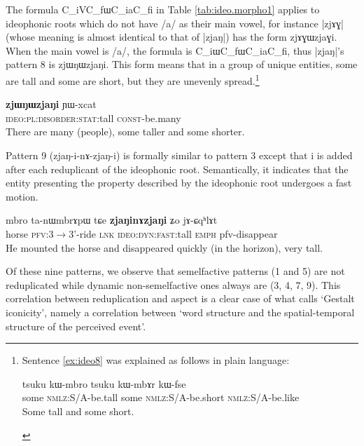 \documentclass[oldfontcommands,oneside,a4paper,11pt]{article}
\newcommand{\ipa}[1]{{\phon \mbox{#1}}} %
\begin{document}
	The formula C_iVC_f\ipa{ɯ}C_i\ipa{a}C_f\ipa{i}  in Table \ref{tab:ideo.morpho1} applies to ideophonic roots  which do  not have /a/ as their main vowel, for instance |\ipa{zjɤɣ}| (whose meaning is almost identical to that of |\ipa{zjaŋ}|) has the form \ipa{zjɤɣɯzjaɣi}. When the main vowel is /a/, the formula is C_i\ipa{ɯ}C_f\ipa{ɯ}C_i\ipa{a}C_f\ipa{i}, thus |\ipa{zjaŋ}|'s pattern 8 is \ipa{zjɯŋɯzjaŋi}. This form means that in a group of unique entities, some are tall and some are short, but  they are unevenly spread.\footnote{Sentence \ref{ex:ideo8} was explained as follows in plain language:
 
 \begin{exe} 
\ex  \label{ex:zjWNWzjaNi:expl}
\gll 
 \ipa{tsuku}  	\ipa{kɯ-mbro}  	\ipa{tsuku}  	\ipa{kɯ-mbɤr}  	\ipa{kɯ-fse}  \\
 some \textsc{nmlz}:S/A-be.tall some \textsc{nmlz}:S/A-be.short \textsc{nmlz}:S/A-be.like \\
 \glt Some tall and some short.
  \end{exe} }
    \begin{exe} 
\ex  \label{ex:ideo8}
\gll 
\ipa{\textbf{zjɯŋɯzjaŋi}}  	\ipa{ɲɯ-xcat}  \\
\textsc{ideo:pl:disorder:stat}:tall \textsc{const}-be.many \\
\glt There are many (people), some taller and some shorter. 
  \end{exe}

Pattern 9 (\ipa{zjaŋ-i-nɤ-zjaŋ-i}) is formally similar to pattern 3 except that \ipa{i} is added after each reduplicant of the ideophonic root. Semantically, it indicates that the entity presenting the property described by the ideophonic root undergoes a fast motion.

    \begin{exe} 
\ex  \label{ex:ideo9}
\gll 
\ipa{mbro}  	\ipa{ta-nɯmbrɤpɯ}  	\ipa{tɕe}  	\ipa{\textbf{zjaŋinɤzjaŋi}}  	\ipa{ʑo}  	\ipa{jɤ-ɕqʰlɤt}  \\
horse \textsc{pfv}:3$\rightarrow$3'-ride \textsc{lnk} \textsc{ideo:dyn:fast}:tall \textsc{emph} pfv-disappear \\
\glt He mounted the horse and disappeared quickly (in the horizon), very tall.
   \end{exe}


Of these nine patterns, we observe that semelfactive  patterns (1 and 5) are not reduplicated while dynamic non-semelfactive ones always are (3, 4, 7, 9). This correlation between reduplication and aspect is a clear case of what \citet[47]{dingemanse11ezra} calls `Gestalt iconicity', namely a correlation between `word structure and the spatial-temporal structure of the perceived event'. 
 
\end{document}
